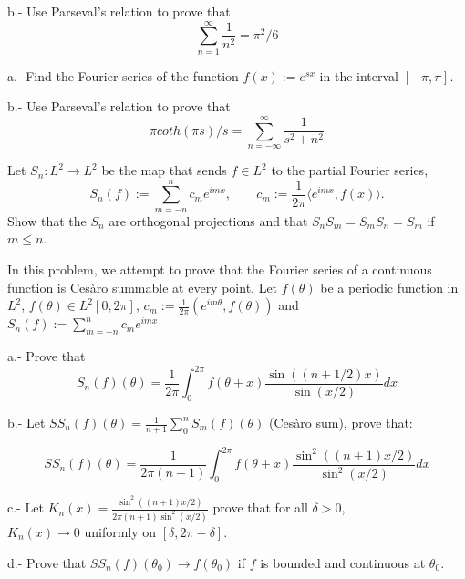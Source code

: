 b.- Use Parseval's relation to prove that 
\begin{equation}
  \sum_{n=1}^{\infty} \frac{1}{n^2} = \pi^2/6
\end{equation}

\epro

\bpro
\espa
a.- Find the Fourier series of the function $f(x):= e^{sx}$ in the
interval $[-\pi, \pi]$.

b.- Use Parseval's relation to prove that 
\begin{equation}
  \pi coth(\pi s)/s = \sum_{n=-\infty}^{\infty} \frac{1}{s^2+n^2}
\end{equation}
\epro

\bpro
Let $S_n: L^2 \to L^2$ be the map that sends $f \in L^2$ to the partial
Fourier series,
\begin{equation}
  S_n(f) := \sum_{m=-n}^{n} c_m e^{imx}, \;\;\;\;\;\;\; 
                 c_m:= \frac{1}{2\pi}\langle e^{imx},f(x) \rangle.
\end{equation}
%
Show that the $S_n$ are orthogonal projections and that 
$S_n S_m = S_m S_n = S_m$ if $m \leq n$.
\epro

\bpro
In this problem, we attempt to prove that the Fourier series of
a continuous function is Cesàro summable at every point.
Let $f(\theta)$ be a periodic function in $L^2$, 
$f(\theta) \in L^2[0,2\pi]$,
$c_m:= \frac{1}{2\pi}(e^{im\theta},f(\theta))$
and \\
$ S_n(f) := \sum_{m=-n}^{n} c_m e^{imx}$

a.- Prove that 
\begin{equation}
  S_n(f)(\theta) = \frac{1}{2\pi} \int_0^{2\pi} f(\theta + x) 
                      \frac{\sin((n+1/2)x)}{\sin(x/2)} dx
\end{equation}

b.- Let $SS_n(f)(\theta) = \frac{1}{n+1} \sum_0^n S_m(f)(\theta)$ (Cesàro sum), prove that:

\begin{equation}
  SS_n(f)(\theta) = \frac{1}{2\pi (n+1)} \int_0^{2\pi} f(\theta + x)
                           \frac{\sin^2((n+1)x/2)}{\sin^2(x/2)} dx
\end{equation}
%

c.- Let $K_n(x) = \frac{\sin^2((n+1)x/2)}{2\pi (n+1) \sin^2(x/2)}$ prove that for all $\delta > 0$, \hfill \\$K_n(x) \to 0$ uniformly on $[\delta, 2\pi-\delta]$.

d.- Prove that $SS_n(f)(\theta_0) \to f(\theta_0)$ if $f$ is bounded and continuous at $\theta_0$.


